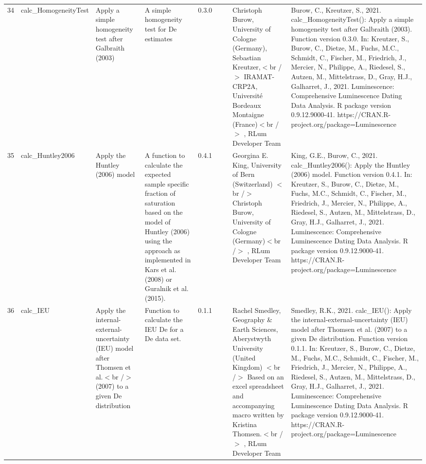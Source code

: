 \begin{table}[ht]
\begin{tabular}{rllllllll}
 \\ 
  34 & calc\_HomogeneityTest & Apply a simple homogeneity test after Galbraith (2003) & A simple homogeneity test for De estimates & 0.3.0
 &  &  & Christoph Burow, University of Cologne (Germany), Sebastian Kreutzer,$<$br /$>$ IRAMAT-CRP2A, Université Bordeaux Montaigne (France)$<$br /$>$ , RLum Developer Team & Burow, C., Kreutzer, S., 2021. calc\_HomogeneityTest(): Apply a simple homogeneity test after Galbraith (2003). Function version 0.3.0. In: Kreutzer, S., Burow, C., Dietze, M., Fuchs, M.C., Schmidt, C., Fischer, M., Friedrich, J., Mercier, N., Philippe, A., Riedesel, S., Autzen, M., Mittelstrass, D., Gray, H.J., Galharret, J., 2021. Luminescence: Comprehensive Luminescence Dating Data Analysis. R package version 0.9.12.9000-41. https://CRAN.R-project.org/package=Luminescence
 \\ 
  35 & calc\_Huntley2006 & Apply the Huntley (2006) model & A function to calculate the expected sample specific fraction of saturation based on the model of Huntley (2006) using the approach as implemented in Kars et al. (2008) or Guralnik et al. (2015). & 0.4.1
 &  &  & Georgina E. King, University of Bern (Switzerland)  $<$br /$>$ Christoph Burow, University of Cologne (Germany)$<$br /$>$ , RLum Developer Team & King, G.E., Burow, C., 2021. calc\_Huntley2006(): Apply the Huntley (2006) model. Function version 0.4.1. In: Kreutzer, S., Burow, C., Dietze, M., Fuchs, M.C., Schmidt, C., Fischer, M., Friedrich, J., Mercier, N., Philippe, A., Riedesel, S., Autzen, M., Mittelstrass, D., Gray, H.J., Galharret, J., 2021. Luminescence: Comprehensive Luminescence Dating Data Analysis. R package version 0.9.12.9000-41. https://CRAN.R-project.org/package=Luminescence
 \\ 
  36 & calc\_IEU & Apply the internal-external-uncertainty (IEU) model after Thomsen et al.$<$br /$>$ (2007) to a given De distribution & Function to calculate the IEU De for a De data set. & 0.1.1
 &  &  & Rachel Smedley, Geography \& Earth Sciences, Aberystwyth University (United Kingdom)  $<$br /$>$ Based on an excel spreadsheet and accompanying macro written by Kristina Thomsen.$<$br /$>$ , RLum Developer Team & Smedley, R.K., 2021. calc\_IEU(): Apply the internal-external-uncertainty (IEU) model after Thomsen et al. (2007) to a given De distribution. Function version 0.1.1. In: Kreutzer, S., Burow, C., Dietze, M., Fuchs, M.C., Schmidt, C., Fischer, M., Friedrich, J., Mercier, N., Philippe, A., Riedesel, S., Autzen, M., Mittelstrass, D., Gray, H.J., Galharret, J., 2021. Luminescence: Comprehensive Luminescence Dating Data Analysis. R package version 0.9.12.9000-41. https://CRAN.R-project.org/package=Luminescence

\end{tabular}
\end{table}

